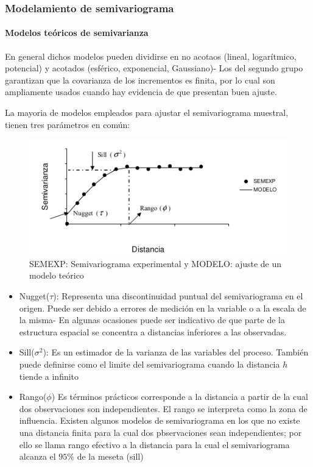 \subsubsection{Modelamiento de semivariograma}

\paragraph{Modelos teóricos de semivarianza}

En general dichos modelos pueden dividirse en no acotaos (lineal, logarítmico, potencial) y acotados (esférico, exponencial, Gaussiano)-  Los del segundo grupo garantizan que la covarianza de los incrementos es finita, por lo cual son ampliamente usados cuando hay evidencia de que presentan buen ajuste.

La mayoria de modelos empleados para ajustar el semivariograma muestral, tienen tres parámetros en común:

\begin{figure}
    \centering
    \includegraphics[scale=0.5]{teoria/images/modelo_semivarianza.png}
    \caption{SEMEXP: Semivariograma experimental y MODELO: ajuste de un modelo teórico}
    \label{modelo_semivarianza}
\end{figure}

\begin{itemize}
    \item Nugget($\tau$): Representa una discontinuidad puntual del semivariograma en el origen. Puede ser debido a errores de medición en la variable o a la escala de la misma- En algunas ocasiones puede ser indicativo de que parte de la estructura espacial se concentra a distancias inferiores a las observadas.
    \item Sill($\sigma^2$): Es un estimador de la varianza de las variables del proceso. También puede definirse como el limite del semivariograma cuando la distancia $h$ tiende a infinito
    \item Rango($\phi$) Es términos prácticos corresponde a la distancia a partir de la cual dos observaciones son independientes. El rango se interpreta como la zona de influencia. Existen algunos modelos de semivariograma en los que no existe una distancia finita para la cual dos pbservaciones sean independientes; por ello se llama rango efectivo a la distancia para la cual el semivariograma alcanza el $95\%$ de la meseta (sill) 
\end{itemize}

